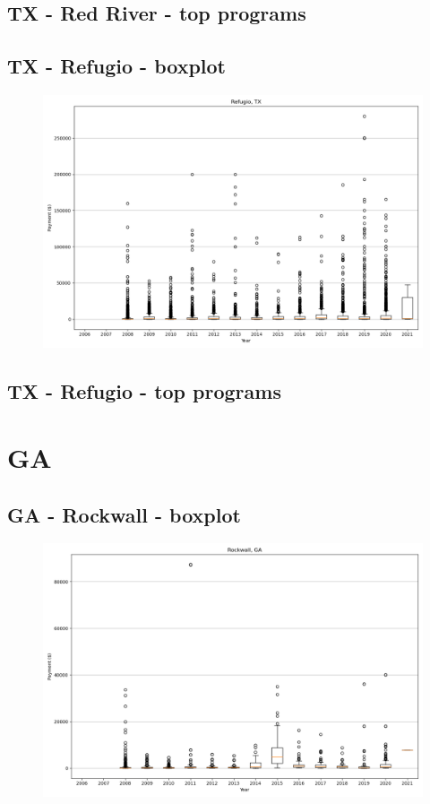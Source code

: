 \subsection*{TX - Red River - top programs}

\newpage
\subsection*{TX - Refugio - boxplot}
\begin{figure}[h]
\centering
\includegraphics[width=7in]{../output/boxplots/counties/Refugio-TX_boxplot.png}
\end{figure}


\subsection*{TX - Refugio - top programs}

\newpage
\section*{GA}
\subsection*{GA - Rockwall - boxplot}
\begin{figure}[h]
\centering
\includegraphics[width=7in]{../output/boxplots/counties/Rockwall-GA_boxplot.png}
\end{figure}


